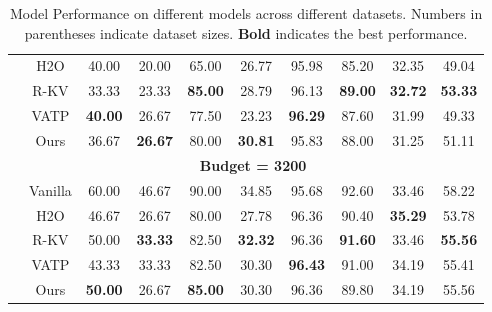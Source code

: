 \begin{table}[t]
\begin{tabular}{l|ccccccccc}
& H2O & 40.00 & 20.00 & 65.00 & 26.77 & 95.98 & 85.20 & 32.35 & 49.04  \\
& R-KV & 33.33 & 23.33 & \textbf{85.00} & 28.79 & 96.13 & \textbf{89.00} & \textbf{32.72} & \textbf{53.33} \\
& VATP & \textbf{40.00} & 26.67 & 77.50 & 23.23 & \textbf{96.29} & 87.60 & 31.99 & 49.33 \\
& Ours & 36.67 & \textbf{26.67} & 80.00 & \textbf{30.81} & 95.83 & 88.00 & 31.25 & 51.11 \\
 & \multicolumn{9}{c}{\cellcolor{cyan!5}\textbf{Budget = 3200}} \\
& Vanilla & 60.00 & 46.67 & 90.00 & 34.85 & 95.68 & 92.60 & 33.46 & 58.22 \\
& H2O & 46.67 & 26.67 & 80.00 & 27.78 & 96.36 & 90.40 & \textbf{35.29} & 53.78 \\
& R-KV & 50.00 & \textbf{33.33} & 82.50 & \textbf{32.32} & 96.36 & \textbf{91.60} & 33.46 & \textbf{55.56} \\
& VATP & 43.33 & 33.33 & 82.50 & 30.30 & \textbf{96.43} & 91.00 & 34.19 & 55.41 \\
& Ours & \textbf{50.00} & 26.67 & \textbf{85.00} & 30.30 & 96.36 & 89.80 & 34.19 & 55.56 \\
\bottomrule
\end{tabular}
\caption{Model Performance on different models across different datasets. Numbers in parentheses indicate dataset sizes. \textbf{Bold} indicates the best performance.}
\label{tab:model_performance}
\end{table}
